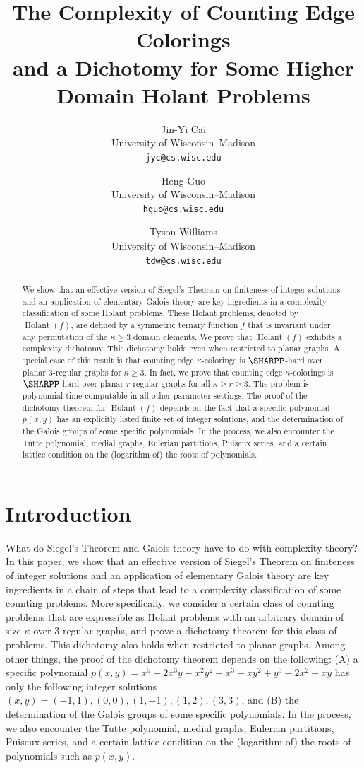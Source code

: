 \documentclass[11pt]{article}
\title{The Complexity of Counting Edge Colorings\\and a Dichotomy for Some Higher Domain Holant Problems}
\author{
 Jin-Yi Cai\\
 \scriptsize University of Wisconsin--Madison\\
 \footnotesize \texttt{jyc@cs.wisc.edu}
 \and
 Heng Guo\\
 \scriptsize University of Wisconsin--Madison\\
 \footnotesize \texttt{hguo@cs.wisc.edu}
 \and
 Tyson Williams\\
 \scriptsize University of Wisconsin--Madison\\
 \footnotesize \texttt{tdw@cs.wisc.edu}
}
\date{} %
\newcommand{\Holant}{\operatorname{Holant}}
\begin{document}
\maketitle

\begin{abstract}
 We show that an effective version of Siegel's Theorem on finiteness of integer solutions and an application of elementary Galois theory
 are key ingredients in a complexity classification of some Holant problems.
 These Holant problems, denoted by $\Holant(f)$,
 are defined by a symmetric ternary function $f$ that is invariant under any permutation of the $\kappa \ge 3$ domain elements.
 We prove that $\Holant(f)$ exhibits a complexity dichotomy.
 This dichotomy holds even when restricted to planar graphs.
 A special case of this result is that counting edge $\kappa$-colorings is $\SHARPP$-hard over planar $3$-regular graphs for $\kappa \ge 3$.
 In fact, we prove that counting edge $\kappa$-colorings is $\SHARPP$-hard over planar $r$-regular graphs for all $\kappa \ge r \ge 3$.
 The problem is polynomial-time computable in all other parameter settings.
 The proof of the dichotomy theorem for $\Holant(f)$ depends on the fact that a specific polynomial $p(x, y)$ has an explicitly listed finite set of integer solutions,
 and the determination of the Galois groups of some specific polynomials.
 In the process,
 we also encounter the Tutte polynomial, medial graphs, Eulerian partitions, Puiseux series,
 and a certain lattice condition on the (logarithm of) the roots of polynomials.
\end{abstract}

\section{Introduction}

What do Siegel's Theorem and Galois theory have to do with complexity theory?
In this paper,
we show that an effective version of Siegel's Theorem on finiteness of integer solutions and an application of elementary Galois theory
are key ingredients in a chain of steps that lead to a complexity classification of some counting problems.
More specifically,
we consider a certain class of counting problems that are expressible as Holant problems
with an arbitrary domain of size $\kappa$ over $3$-regular graphs,
and prove a dichotomy theorem for this class of problems.
This dichotomy also holds when restricted to planar graphs.
Among other things, the proof of the dichotomy theorem depends on 
the following: (A) a specific polynomial
$p(x,y) = x^5 - 2 x^3 y - x^2 y^2 - x^3 + x y^2 + y^3 - 2 x^2 - x y$
has only the following integer solutions
$(x,y) = (-1,1), (0,0), (1,-1), (1,2), (3,3)$,
and (B) the determination of the Galois groups of some specific polynomials.
In the process,
we also encounter the Tutte polynomial, medial graphs, Eulerian partitions, Puiseux series,
and a certain lattice condition on the (logarithm of) the roots of polynomials such as $p(x,y)$.
\end{document}
